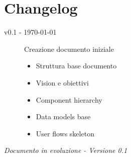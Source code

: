 \documentclass[11pt,a4paper]{article}
\begin{document}
\newpage

\appendix
\section{Changelog}

\begin{description}
    \item[v0.1 - \today] Creazione documento iniziale
    \begin{itemize}
        \item Struttura base documento
        \item Vision e obiettivi
        \item Component hierarchy
        \item Data models base
        \item User flows skeleton
    \end{itemize}
\end{description}

\vspace{2cm}

\begin{center}
\textit{Documento in evoluzione - Versione 0.1}
\end{center}
\end{document}
